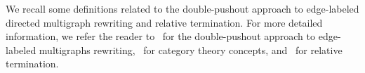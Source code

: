 We recall some definitions related to the double-pushout approach to edge-labeled directed multigraph rewriting and relative termination. For more detailed information, we refer the reader to~\cite{konig2018atutorial,corradini1997algebraic} for the double-pushout approach to edge-labeled multigraphs rewriting,~\cite{pierce1991basic,barr1990category} for category theory concepts, and~\cite{geser1990relative} for relative termination.